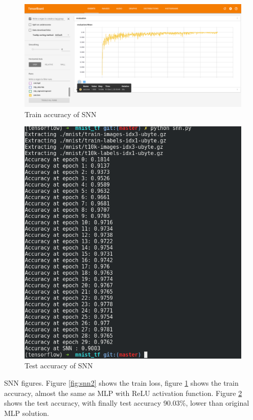 \documentclass[10pt,twocolumn,letterpaper]{article}
\begin{document}
\begin{CJK}{UTF8}{gbsn}
\begin{figure}
\begin{center}
   \includegraphics[width=0.9\linewidth]{snn1.png}
\end{center}
\caption{Train accuracy of SNN}
\label{fig:snn1}
\end{figure}

\begin{figure}
\begin{center}
   \includegraphics[width=0.9\linewidth]{snn3.png}
\end{center}
\caption{Test accuracy of SNN}
\label{fig:snn3}
\end{figure}

SNN figures. Figure \ref{fig:snn2} shows the train loss, figure \ref{fig:snn1} shows the train accuracy, almost the same as MLP with ReLU activation function. Figure \ref{fig:snn3} shows the test accuracy, with finally test accuracy 90.03\%, lower than original MLP solution.


\end{CJK}
\end{document}
